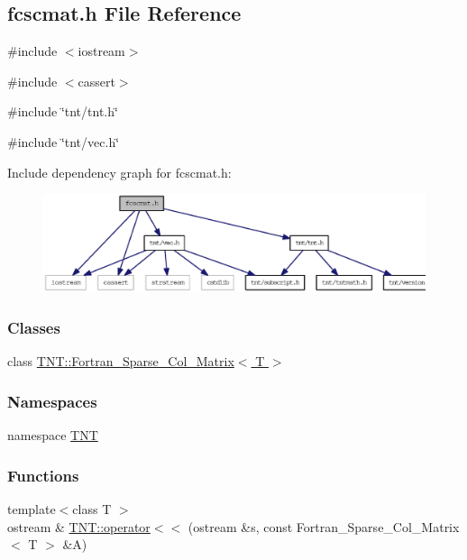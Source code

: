 \subsection{fcscmat.h File Reference}
\label{fcscmat_8h}
{\ttfamily \#include $<$iostream$>$}\par
{\ttfamily \#include $<$cassert$>$}\par
{\ttfamily \#include \char`\"{}tnt/tnt.h\char`\"{}}\par
{\ttfamily \#include \char`\"{}tnt/vec.h\char`\"{}}\par
Include dependency graph for fcscmat.h:
\nopagebreak
\begin{figure}[H]
\begin{center}
\leavevmode
\includegraphics[width=400pt]{fcscmat_8h__incl}
\end{center}
\end{figure}
\subsubsection*{Classes}
\begin{DoxyCompactItemize}
\item 
class \hyperlink{class_t_n_t_1_1_fortran___sparse___col___matrix}{TNT::Fortran\_\-Sparse\_\-Col\_\-Matrix$<$ T $>$}
\end{DoxyCompactItemize}
\subsubsection*{Namespaces}
\begin{DoxyCompactItemize}
\item 
namespace \hyperlink{namespace_t_n_t}{TNT}
\end{DoxyCompactItemize}
\subsubsection*{Functions}
\begin{DoxyCompactItemize}
\item 
{\footnotesize template$<$class T $>$ }\\ostream \& \hyperlink{namespace_t_n_t_aabe10faab5f25861605faea3a85ab948}{TNT::operator$<$$<$} (ostream \&s, const Fortran\_\-Sparse\_\-Col\_\-Matrix$<$ T $>$ \&A)
\end{DoxyCompactItemize}
